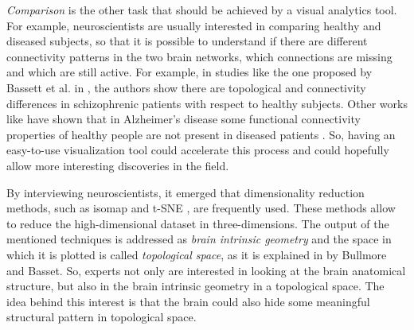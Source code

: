 \documentclass{article}
\begin{document}
\begin{multicols}{2}
\textit{Comparison} is the other task that should be achieved by a visual analytics tool. For example, neuroscientists are usually interested in comparing healthy and diseased subjects, so that it is possible to understand if there are different connectivity patterns in the two brain networks, which connections are missing and which are still active. For example, in studies like the one proposed by Bassett et al. in \cite{hierarchicalOrganization}, the authors show there are topological and connectivity differences in schizophrenic patients with respect to healthy subjects. Other works like \cite{alzheimer} have shown that in Alzheimer's disease some functional connectivity properties of healthy people are not present in diseased patients . So, having an easy-to-use visualization tool could accelerate this process and could hopefully allow more interesting discoveries in the field.

By interviewing neuroscientists, it emerged that dimensionality reduction methods, such as isomap \cite{isomap} and t-SNE \cite{tsne}, are frequently used. These methods allow to reduce the high-dimensional dataset in three-dimensions. The output of the mentioned techniques is addressed as \textit{brain intrinsic geometry} and the space in which it is plotted is called \textit{topological space}, as it is explained in \cite{bullmore2011brain} by Bullmore and Basset. So, experts not only are interested in looking at the brain anatomical structure, but also in the brain intrinsic geometry in a topological space. The idea behind this interest is that the brain could also hide some meaningful structural pattern in topological space.


\end{multicols}
\end{document}
